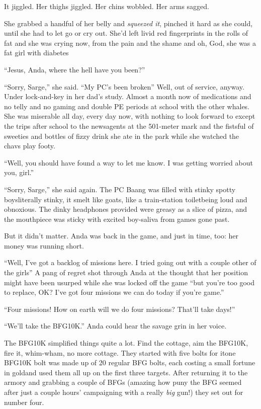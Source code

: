 It jiggled. Her thighs jiggled. Her chins wobbled. Her arms
sagged.

She grabbed a handful of her belly and \emph{squeezed it}, pinched
it hard as she could, until she had to let go or cry out. She’d
left livid red fingerprints in the rolls of fat and she was crying
now, from the pain and the shame and oh, God, she was a fat girl
with diabetes\dash{}

\tb

“Jesus, Anda, where the hell have you been?”

“Sorry, Sarge,” she said. “My PC’s been broken\dash{}” Well, out of
service, anyway. Under lock-and-key in her dad’s study. Almost a
month now of medications and no telly and no gaming and double PE
periods at school with the other whales. She was miserable all day,
every day now, with nothing to look forward to except the trips
after school to the newsagents at the 501-meter mark and the
fistsful of sweeties and bottles of fizzy drink she ate in the park
while she watched the chavs play footy.

“Well, you should have found a way to let me know. I was getting
worried about you, girl.”

“Sorry, Sarge,” she said again. The PC Baang was filled with stinky
spotty boys\dash{}literally stinky, it smelt like goats, like a
train-station toilet\dash{}being loud and obnoxious. The dinky headphones
provided were greasy as a slice of pizza, and the mouthpiece was
sticky with excited boy-saliva from games gone past.

But it didn’t matter. Anda was back in the game, and just in time,
too: her money was running short.

“Well, I’ve got a backlog of missions here. I tried going out with
a couple other of the girls\dash{}” A pang of regret shot through Anda at
the thought that her position might have been usurped while she was
locked off the game “\dash{}but you’re too good to replace, OK? I’ve got
four missions we can do today if you’re game.”

“Four missions! How on earth will we do four missions? That’ll take
days!”

“We’ll take the BFG10K.” Anda could hear the savage grin in her
voice.

\tb

The BFG10K simplified things quite a lot. Find the cottage, aim the
BFG10K, fire it, whim-wham, no more cottage. They started with five
bolts for it\dash{}one BFG10K bolt was made up of 20 regular BFG bolts,
each costing a small fortune in gold\dash{}and used them all up on the
first three targets. After returning it to the armory and grabbing
a couple of BFGs (amazing how puny the BFG seemed after just a
couple hours’ campaigning with a really \emph{big} gun!) they set
out for number four.

